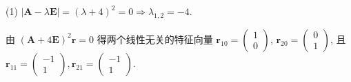\begin{solve}
  (1) $|\bm{A}-\lambda\bm{E}|=(\lambda+4)^2=0\Rightarrow\lambda_{1,2}=-4$.

  由 $(\bm{A}+4\bm{E})^2\bm{r}=0$ 得两个线性无关的特征向量
  $\bm{r}_{10}=\begin{pmatrix}1\\0\end{pmatrix}$,
  $\bm{r}_{20}=\begin{pmatrix}0\\1\end{pmatrix}$, 
  且 $\bm{r}_{11}=\begin{pmatrix}-1\\1\end{pmatrix},\bm{r}_{21}=\begin{pmatrix}-1\\1\end{pmatrix}$.


\end{solve}
